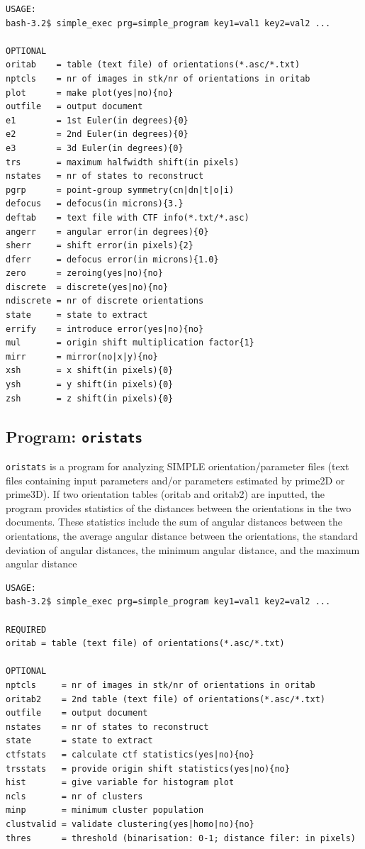 \documentclass[a4paper,11pt]{article}
\newcommand{\prgname}[1]{\textcolor{NavyBlue}{\texttt{#1}}}
\begin{document}
\begin{verbatim}
USAGE:
bash-3.2$ simple_exec prg=simple_program key1=val1 key2=val2 ...

OPTIONAL
oritab    = table (text file) of orientations(*.asc/*.txt)
nptcls    = nr of images in stk/nr of orientations in oritab
plot      = make plot(yes|no){no}
outfile   = output document
e1        = 1st Euler(in degrees){0}
e2        = 2nd Euler(in degrees){0}
e3        = 3d Euler(in degrees){0}
trs       = maximum halfwidth shift(in pixels)
nstates   = nr of states to reconstruct
pgrp      = point-group symmetry(cn|dn|t|o|i)
defocus   = defocus(in microns){3.}
deftab    = text file with CTF info(*.txt/*.asc)
angerr    = angular error(in degrees){0}
sherr     = shift error(in pixels){2}
dferr     = defocus error(in microns){1.0}
zero      = zeroing(yes|no){no}
discrete  = discrete(yes|no){no}
ndiscrete = nr of discrete orientations
state     = state to extract
errify    = introduce error(yes|no){no}
mul       = origin shift multiplication factor{1}
mirr      = mirror(no|x|y){no}
xsh       = x shift(in pixels){0}
ysh       = y shift(in pixels){0}
zsh       = z shift(in pixels){0}
\end{verbatim}

\subsection{Program: \prgname{oristats}}
\label{oristats}
\prgname{oristats} is a program for analyzing SIMPLE orientation/parameter files (text files containing input parameters and/or parameters estimated by prime2D or prime3D). If two orientation tables (oritab and oritab2) are inputted, the program provides statistics of the distances between the orientations in the two documents. These statistics include the sum of angular distances between the orientations, the average angular distance between the orientations, the standard deviation of angular distances, the minimum angular distance, and the maximum angular distance

\begin{verbatim}
USAGE:
bash-3.2$ simple_exec prg=simple_program key1=val1 key2=val2 ...

REQUIRED
oritab = table (text file) of orientations(*.asc/*.txt)

OPTIONAL
nptcls     = nr of images in stk/nr of orientations in oritab
oritab2    = 2nd table (text file) of orientations(*.asc/*.txt)
outfile    = output document
nstates    = nr of states to reconstruct
state      = state to extract
ctfstats   = calculate ctf statistics(yes|no){no}
trsstats   = provide origin shift statistics(yes|no){no}
hist       = give variable for histogram plot
ncls       = nr of clusters
minp       = minimum cluster population
clustvalid = validate clustering(yes|homo|no){no}
thres      = threshold (binarisation: 0-1; distance filer: in pixels)
\end{verbatim}
\end{document}
